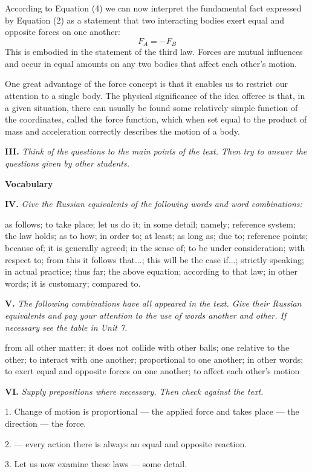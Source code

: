 \documentclass[a4paper]{article}
\newcommand{\ESect}[1]{\medskip\par{\large \textbf{#1}}\par}
\newcommand{\ETask}[2]{\medskip\par\textbf{#1.} \textit{#2}\par}
\begin{document}
According to Equation (4) we can now interpret the fundamental fact expressed by Equation (2) as a statement that two interacting
bodies exert equal and opposite forces on one another:
$$F_A = -F_B$$
This is embodied in the statement of the third law. Forces are mutual influences and occur in equal amounts on any two bodies
that affect each other's motion.

One great advantage of the force concept is that it enables us to restrict our attention to a single body. The physical
significance of the idea offeree is that, in a given situation, there can usually be found some relatively simple function
of the coordinates, called the force function, which when set equal to the product of mass and acceleration correctly
describes the motion of a body.

\ETask{III}{Think of the questions to the main points of the text. Then try to answer the questions given by other students.}

\ESect{Vocabulary}

\ETask{IV}{Give the Russian equivalents of the following words and word combinations:}
as follows; to take place; let us do it; in some detail; namely; reference system; the law holds; as to how; in order to;
at least; as long as; due to; reference points; because of; it is generally agreed; in the sense of; to be under consideration;
with respect to; from this it follows that...; this will be the case if...; strictly speaking; in actual practice; thus far;
the above equation; according to that law; in other words; it is customary; compared to.

\ETask{V}{The following combinations have all appeared in the text. Give their Russian equivalents and pay your attention to
the use of words another and other. If necessary see the table in Unit 7.}
from all other matter; it does not collide with other balls; one relative to the other; to interact with one another;
proportional to one another; in other words; to exert equal and opposite forces on one another; to affect each other's motion

\ETask{VI}{Supply prepositions where necessary. Then check against the text.}

1. Change of motion is proportional --- the applied force and takes place --- the direction --- the force.

2. --- every action there is always an equal and opposite reaction.

3. Let us now examine these laws --- some detail.
\end{document}
